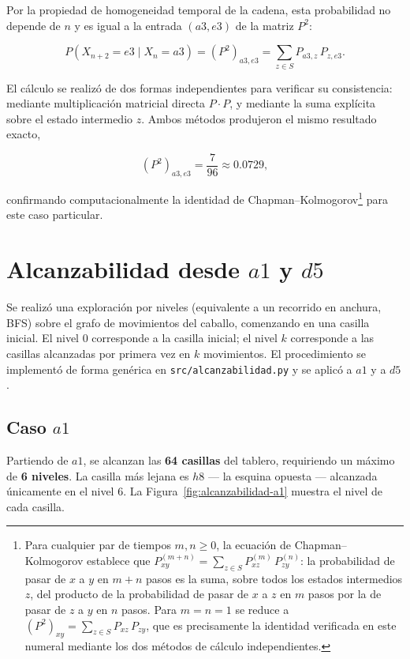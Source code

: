 \documentclass[12pt,a4paper]{article}
\begin{document}
Por la propiedad de homogeneidad temporal de la cadena, esta
probabilidad no depende de \(n\) y es igual a la entrada
\((a3,e3)\) de la matriz \(P^2\):

\[
P(X_{n+2}=e3\mid X_n=a3)=(P^2)_{a3,e3}
=\sum_{z\in S}P_{a3,z}\,P_{z,e3}.
\]

El cálculo se realizó de dos formas independientes para verificar su
consistencia: mediante multiplicación matricial directa \(P\cdot P\), y
mediante la suma explícita sobre el estado intermedio \(z\). Ambos
métodos produjeron el mismo resultado exacto,

\[
(P^2)_{a3,e3}=\frac{7}{96}\approx0.0729,
\]

confirmando computacionalmente la identidad de
Chapman--Kolmogorov\footnote{Para cualquier par de tiempos
$m,n\geq0$, la ecuación de Chapman--Kolmogorov establece que
$P^{(m+n)}_{xy}=\sum_{z\in S}P^{(m)}_{xz}\,P^{(n)}_{zy}$: la
probabilidad de pasar de $x$ a $y$ en $m+n$ pasos es la suma, sobre
todos los estados intermedios $z$, del producto de la probabilidad de
pasar de $x$ a $z$ en $m$ pasos por la de pasar de $z$ a $y$ en $n$
pasos. Para $m=n=1$ se reduce a
$(P^2)_{xy}=\sum_{z\in S}P_{xz}\,P_{zy}$, que es precisamente la
identidad verificada en este numeral mediante los dos métodos de
cálculo independientes.}
para este caso particular.


\section{Alcanzabilidad desde \texorpdfstring{\(a1\)}{a1} y \texorpdfstring{\(d5\)}{d5}}
\label{sec:alcanzabilidad}

Se realizó una exploración por niveles (equivalente a un recorrido en
anchura, BFS) sobre el grafo de movimientos del caballo, comenzando en
una casilla inicial. El nivel \(0\) corresponde a la casilla inicial;
el nivel \(k\) corresponde a las casillas alcanzadas por primera vez en
\(k\) movimientos. El procedimiento se implementó de forma genérica en
\texttt{src/alcanzabilidad.py} y se aplicó a \(a1\) y a \(d5\).

\subsection{Caso \texorpdfstring{\(a1\)}{a1}}

Partiendo de \(a1\), se alcanzan las \textbf{64 casillas} del tablero,
requiriendo un máximo de \textbf{6 niveles}. La casilla más lejana es
\(h8\) --- la esquina opuesta --- alcanzada únicamente en el nivel 6.
La Figura~\ref{fig:alcanzabilidad-a1} muestra el nivel de cada casilla.
\end{document}
